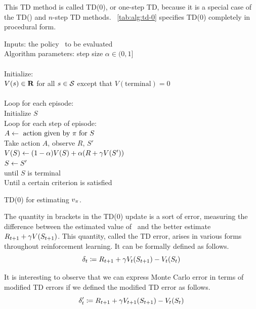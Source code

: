 This TD method is called TD(0),
or one-step TD,
because it is a special case of the TD(\tdparam)
and $n$-step TD methods.
\tablename~\ref{tab:alg:td-0} specifies TD(0) completely in procedural form.


\begin{table}
\beginalg
Inputs: the policy \pol\ to be evaluated\\
Algorithm parameters: step size $\alpha\in(0,1]$\\
\\
Initialize:\\
\>$V(s) \in \mathbf{R}$ for all $s \in \mathcal{S}$ except that $V(\mathrm{terminal}) = 0$ \\
\\
Loop for each episode:\\
\> Initialize $S$\\
\> Loop for each step of episode:\\
\> \> $A \leftarrow \mbox{ action given by } \pi \mbox{ for } S$\\
\> \> Take action $A$, observe $R$, $S'$\\
\> \> $V(S) \leftarrow (1-\alpha) V(S) + \alpha(R + \gamma V(S'))$\\
\> \> $S \leftarrow S'$\\
\> until $S$ is terminal\\
Until a certain criterion is satisfied
\endalg
\caption{TD(0) for estimating $v_{\pi}$.}
\label{tab:alg:td-0}
\end{table}


The quantity in brackets in the TD(0) update is a sort of error,
measuring the difference between the estimated value of \
and the better estimate $R_{t+1} + \gamma V(S_{t+1})$.
This quantity, called the TD error, arises in various forms throughout reinforcement learning.
It can be formally defined as follows.
\begin{equation}
\label{eq:one-step-error}
\delta_{t} \coloneqq R_{t+1} + \gamma V_t(S_{t+1}) - V_t(S_{t})
\end{equation}

It is interesting to observe that we can express Monte Carlo error in terms of modified TD errors
if we defined the modified TD error as follows.
\begin{equation}
\label{eq:one-step-error-var}
\delta'_{t} \coloneqq R_{t+1} + \gamma V_{t+1}(S_{t+1}) - V_t(S_{t})
\end{equation}

